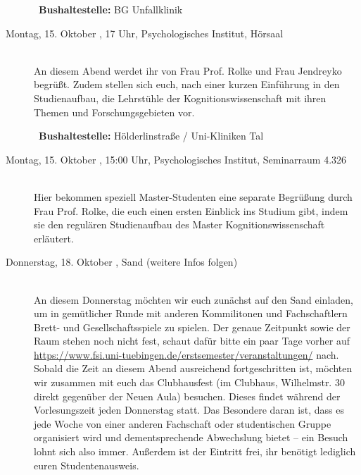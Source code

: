 \begin{description}
~\textbf{Bushaltestelle:} BG Unfallklinik
\fi





\ifkogwiss
\ifbachelor 
\item[Montag, 15. Oktober \Jahr, 17 Uhr, Psychologisches Institut, Hörsaal]\ \\
An diesem Abend werdet ihr von Frau Prof. Rolke und Frau Jendreyko begrüßt. Zudem stellen sich euch, nach einer kurzen Einführung in den Studienaufbau, die Lehrstühle der Kognitionswissenschaft mit ihren Themen und Forschungsgebieten vor.
\fi

~\textbf{Bushaltestelle:} Hölderlinstraße / Uni-Kliniken Tal
\fi 

\ifkogwiss
\ifmaster
\item[Montag, 15. Oktober \Jahr, 15:00 Uhr, Psychologisches Institut, Seminarraum 4.326 ]\ \\
Hier bekommen speziell Master-Studenten eine separate Begrüßung durch Frau Prof. Rolke, die euch einen ersten Einblick ins Studium gibt, indem sie den regulären Studienaufbau des Master Kognitionswissenschaft erläutert. %
\fi
\fi 




\item[Donnerstag, 18. Oktober \Jahr,  Sand (weitere Infos folgen)]\ \\
An diesem Donnerstag möchten wir euch zunächst auf den Sand einladen, um in gemütlicher Runde mit anderen Kommilitonen und Fachschaftlern Brett- und Gesellschaftsspiele zu spielen. Der genaue Zeitpunkt sowie der Raum stehen noch nicht fest, schaut dafür bitte ein paar Tage vorher auf \url{https://www.fsi.uni-tuebingen.de/erstsemester/veranstaltungen/} nach.\\ Sobald die Zeit an diesem Abend ausreichend fortgeschritten ist, möchten wir zusammen mit euch das Clubhausfest (im Clubhaus, Wilhelmstr. 30 direkt gegenüber der Neuen Aula) besuchen. Dieses findet während der Vorlesungszeit jeden Donnerstag statt. Das Besondere daran ist, dass es jede Woche von einer anderen Fachschaft oder studentischen Gruppe organisiert wird und dementsprechende Abwechslung bietet -- ein Besuch lohnt sich also immer. Außerdem ist der Eintritt frei, ihr benötigt lediglich euren Studentenausweis.


\end{description}
